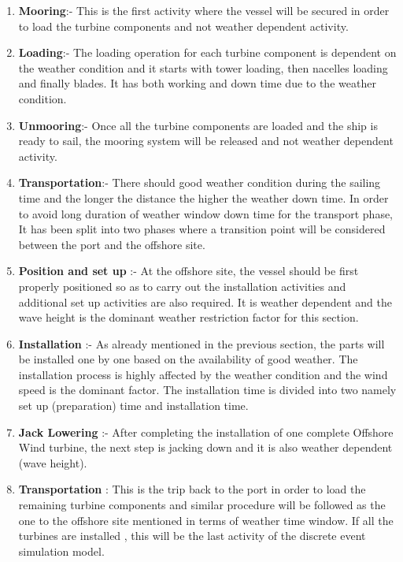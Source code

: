 \begin{enumerate}
\item \textbf{Mooring}:- This is the first activity where the vessel will be secured in order to load the turbine components and not weather dependent activity.
\item \textbf{Loading}:- The loading operation for each turbine component is dependent on the weather condition and it starts with tower loading, then nacelles loading and finally blades. It has both working and down time due to the weather condition.
\item \textbf{Unmooring}:- Once all the turbine components are loaded and the ship is ready to sail, the mooring system will be released and not weather dependent activity.
\item \textbf{Transportation}:- There should good weather condition during the sailing time and the longer the distance the higher the weather down time. In order to avoid long duration of weather window down time  for the transport phase, It has been split into two phases where a transition point will be considered between the port and the offshore site.
\item \textbf{Position and set up} :- At the offshore site, the vessel should be first properly positioned so as to carry out the installation activities and  additional set up activities are also required. It is weather dependent and the wave height is the dominant weather restriction factor for this section.

\item \textbf{Installation} :- As already mentioned in the previous section, the parts will be installed one by one based on the availability of good weather. The installation process is highly affected by the weather condition and the wind speed is the dominant factor. The installation time is  divided into two namely set up (preparation) time and installation time. 
\item \textbf{Jack Lowering} :- After completing the installation of one complete Offshore Wind turbine, the next step is jacking down and it is also weather dependent (wave height).
\item \textbf{Transportation} : This is the trip back to the port in order to load the remaining turbine components and similar procedure will be followed as the one to the offshore site mentioned in terms of weather time window. If all the turbines are installed , this will be the last activity of the discrete event simulation model.

\end{enumerate}